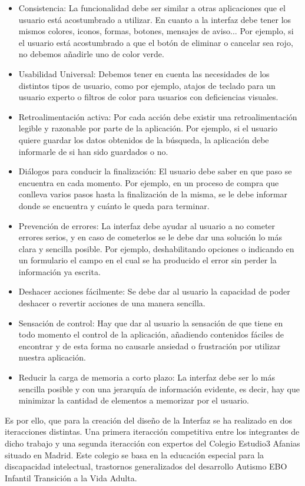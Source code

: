 \begin{itemize} 
	\item Consistencia: La funcionalidad debe ser similar a otras aplicaciones que el usuario está acostumbrado a utilizar. En cuanto a la interfaz debe tener los mismos colores, iconos, formas, botones, mensajes de aviso... Por ejemplo, si el usuario está acostumbrado a que el botón de eliminar o cancelar sea rojo, no debemos añadirle uno de color verde.
	\item Usabilidad Universal: Debemos tener en cuenta las necesidades de los distintos tipos de usuario, como por ejemplo, atajos de teclado para un usuario experto o filtros de color para usuarios con deficiencias visuales.
	\item Retroalimentación activa: Por cada acción debe existir una retroalimentación legible y razonable por parte de la aplicación. Por ejemplo, si el usuario quiere guardar los datos obtenidos de la búsqueda, la aplicación debe informarle de si han sido guardados o no.
	\item Diálogos para conducir la finalización: El usuario debe saber en que paso se encuentra en cada momento. Por ejemplo, en un proceso de compra que conlleva varios pasos hasta la finalización de la misma, se le debe informar donde se encuentra y cuánto le queda para terminar.
	\item Prevención de errores: La interfaz debe ayudar al usuario a no cometer errores serios, y en caso de cometerlos se le debe dar una solución lo más clara y sencilla posible. Por ejemplo, deshabilitando opciones o indicando en un formulario el campo en el cual se ha producido el error sin perder la información ya escrita.
	\item Deshacer acciones fácilmente: Se debe dar al usuario la capacidad de poder deshacer o revertir acciones de una manera sencilla. 
	\item Sensación de control: Hay que dar al usuario la sensación de que tiene en todo momento el control de la aplicación, añadiendo contenidos fáciles de encontrar y de esta forma no causarle ansiedad o frustración por utilizar nuestra aplicación.
	\item Reducir la carga de memoria a corto plazo: La interfaz debe ser lo más sencilla posible y con una jerarquía de información evidente, es decir, hay que minimizar la cantidad de elementos a memorizar por el usuario.
\end{itemize}
Es por ello, que para la creación del diseño de la Interfaz se ha realizado en dos iteracciones distintas. Una primera iteracción competitiva entre los integrantes de dicho trabajo y una segunda iteracción con expertos del Colegio Estudio3 Afanias situado en Madrid. Este colegio se basa en la educación especial para la discapacidad intelectual, trastornos generalizados del desarrollo Autismo EBO Infantil Transición a la Vida Adulta.

